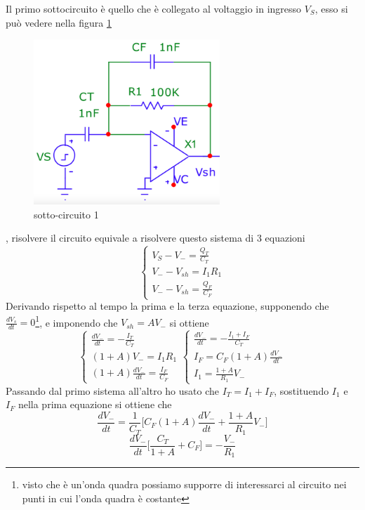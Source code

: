 \documentclass{article}
\begin{document}
		Il primo sottocircuito è quello che è collegato al voltaggio in ingresso $V_S$, esso si può vedere nella figura \ref{fig:circ1}
		\begin{figure}
			\centering
			\includegraphics[width=70mm]{immagini/circ1a.png}
			\caption{sotto-circuito 1}
			\label{fig:circ1}
		\end{figure}
		, risolvere il circuito equivale a risolvere questo sistema di 3 equazioni
		\begin{equation}
			\begin{cases}
				V_S-V_-=\frac{Q_T}{C_T}\\
				V_--V_{sh}=I_1R_1\\
				V_--V_{sh}=\frac{Q_F}{C_F}
			\end{cases}
		\end{equation}
		Derivando rispetto al tempo la prima e la terza equazione, supponendo che $\frac{dV_s}{dt}=0$\footnote{visto che è un'onda quadra possiamo supporre di interessarci al circuito nei punti in cui l'onda quadra è costante}, e imponendo che $V_{sh}=AV_-$ si ottiene
		\[
			\begin{cases}
				\frac{dV_-}{dt}=-\frac{I_T}{C_T}\\
				(1+A)V_-=I_1R_1\\
				(1+A)\frac{dV_-}{dt}=\frac{I_F}{C_F}
			\end{cases}
			\begin{cases}
				\frac{dV_-}{dt}=-\frac{I_1+I_F}{C_T}\\
				I_F=C_F(1+A)\frac{dV_-}{dt}\\
				I_1=\frac{1+A}{R_1}V_-
			\end{cases}
		\]
		Passando dal primo sistema all'altro ho usato che $I_T=I_1+I_F$, sostituendo $I_1$ e $I_F$ nella prima equazione si ottiene che
		\[
			\frac{dV_-}{dt}=\frac{1}{C_T}\bigg[C_F(1+A)\frac{dV_-}{dt}+\frac{1+A}{R_1}V_-\bigg]
		\]
		\[
			\frac{dV_-}{dt}\bigg[\frac{C_T}{1+A}+C_F\bigg]=-\frac{V_-}{R_1}
		\]
\end{document}

